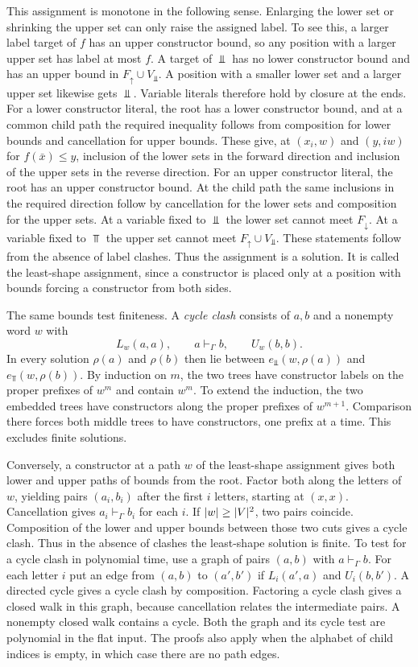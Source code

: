 This assignment is monotone in the following sense. Enlarging the
lower set or shrinking the upper set can only raise the assigned
label. To see this, a larger label target of $f$ has an upper
constructor bound, so any position with a larger upper set has
label at most $f$. A target of $\Bot$ has no lower constructor
bound and has an upper bound in $F_\uparrow\cup V_\Bot$. A position
with a smaller lower set and a larger upper set likewise gets
$\Bot$. Variable literals therefore hold by closure at the ends.
For a lower constructor literal, the root has a lower constructor
bound, and at a common child path the required inequality follows
from composition for lower bounds and cancellation for upper
bounds. These give, at $(x_i,w)$ and $(y,iw)$ for
$f(\bar x)\le y$, inclusion of the lower sets in the forward
direction and inclusion of the upper sets in the reverse direction.
For an upper constructor literal, the root has an upper constructor
bound. At the child path the same inclusions in the required direction
follow by cancellation for the lower sets and composition for the
upper sets. At a variable fixed to $\Bot$ the lower set cannot meet
$F_\downarrow$. At a variable fixed to $\Top$ the upper set cannot
meet $F_\uparrow\cup V_\Bot$. These statements follow from the absence
of label clashes. Thus the assignment is a solution. It is called
the least-shape assignment, since a constructor is placed only at
a position with bounds forcing a constructor from both sides.

The same bounds test finiteness. A \emph{cycle clash} consists of
$a,b$ and a nonempty word $w$ with
\[
   L_w(a,a),\qquad a\vdash_\Gamma b,\qquad U_w(b,b).
\]
In every solution $\rho(a)$ and $\rho(b)$ then lie between
$e_\Bot(w,\rho(a))$ and $e_\Top(w,\rho(b))$. By induction on $m$,
the two trees have constructor labels on the proper prefixes of
$w^m$ and contain $w^m$. To extend the induction, the two embedded
trees have constructors along the proper prefixes of $w^{m+1}$.
Comparison there forces both middle trees to have constructors,
one prefix at a time. This excludes finite solutions.

Conversely, a constructor at a path $w$ of the least-shape assignment
gives both lower and upper paths of bounds from the root. Factor
both along the letters of $w$, yielding pairs $(a_i,b_i)$ after
the first $i$ letters, starting at $(x,x)$. Cancellation gives
$a_i\vdash_\Gamma b_i$ for each $i$. If $\lvert w\rvert\ge |V|^2$, two
pairs coincide. Composition of the lower and upper bounds between
those two cuts gives a cycle clash. Thus in the absence of clashes
the least-shape solution is finite. To test for a cycle clash in
polynomial time, use a graph of pairs $(a,b)$ with $a\vdash_\Gamma b$.
For each letter $i$ put an edge from $(a,b)$ to $(a',b')$ if
$L_i(a',a)$ and $U_i(b,b')$. A directed cycle gives a cycle clash by
composition. Factoring a cycle clash gives a closed walk in this graph,
because cancellation relates the intermediate pairs. A nonempty
closed walk contains a cycle. Both the graph and its cycle test are
polynomial in the flat input. The proofs also apply when the alphabet
of child indices is empty, in which case there are no path edges.

